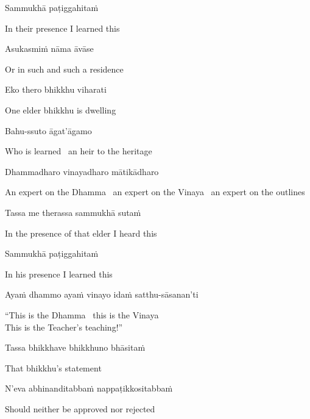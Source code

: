 Sammukhā paṭiggahitaṁ

\begin{english}
  In their presence I learned this
\end{english}

Asukasmiṁ nāma āvāse

\begin{english}
  Or in such and such a residence
\end{english}

Eko thero bhikkhu viharati

\begin{english}
  One elder bhikkhu is dwelling
\end{english}

Bahu-ssuto āgat'āgamo

\begin{english}
  Who is learned \breathmark\ an heir to the heritage
\end{english}

Dhammadharo vinayadharo mātikādharo

\begin{english-hang}
  An expert on the Dhamma \breathmark\ an expert on the Vinaya \breathmark\ an expert on the outlines
\end{english-hang}

Tassa me therassa sammukhā sutaṁ

\begin{english}
  In the presence of that elder I heard this
\end{english}

Sammukhā paṭiggahitaṁ

\begin{english}
  In his presence I learned this
\end{english}

Ayaṁ dhammo ayaṁ vinayo idaṁ satthu-sāsanan'ti

\begin{english}
  ``This is the Dhamma \breathmark\ this is the Vinaya\\
  This is the Teacher's teaching!''
\end{english}

Tassa bhikkhave bhikkhuno bhāsitaṁ

\begin{english}
  That bhikkhu's statement
\end{english}

N'eva abhinanditabbaṁ nappaṭikkositabbaṁ

\begin{english}
  Should neither be approved nor rejected
\end{english}

